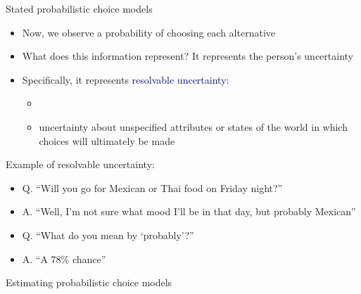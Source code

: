 \documentclass[aspectratio=169]{beamer}
\begin{document}
\begin{frame}

Stated probabilistic choice models

\bigskip{}

\begin{itemize}
\itemsep1.5em
\item<2-> Now, we observe a probability of choosing each alternative
\item<3-> What does this information represent? It represents the person's uncertainty
\item<4-> Specifically, it represents \textcolor{navy}{resolvable uncertainty:} 
\begin{itemize}
    \item<5->[]
    \item<5-> uncertainty about unspecified attributes or states of the world in which choices will ultimately be made
\end{itemize}

\end{itemize}

\end{frame}

\begin{frame}

Example of resolvable uncertainty:

\bigskip{}

\begin{itemize}
\itemsep1.5em
\item<2-> Q. ``Will you go for Mexican or Thai food on Friday night?''
\item<3-> A. ``Well, I'm not sure what mood I'll be in that day, but probably Mexican''
\item<4-> Q. ``What do you mean by `probably'?''
\item<5-> A. ``A 78\% chance''
\end{itemize}

\bigskip{}

\end{frame}

\begin{frame}

Estimating probabilistic choice models

\bigskip{}


\bigskip{}


\bigskip{}


\end{frame}
\end{document}
